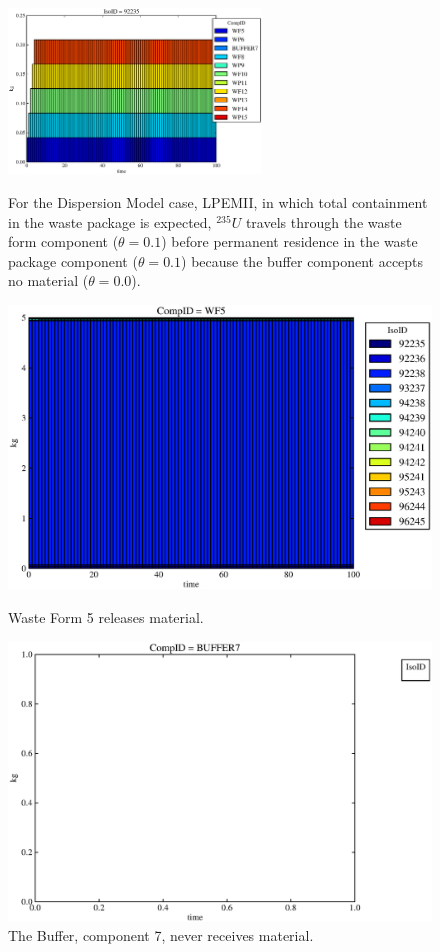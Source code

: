 \begin{figure}[ht]
\centering
\includegraphics[width=0.6\textwidth]{./chapters/demonstration/base/lpDMII.eps}
\caption[$^{235}U$ residence. Lumped Parameter  DM Waste Package No Release.]{
For the Dispersion Model case, LPEMII, in which total containment in the waste 
package is expected, $^{235}U$ travels through the waste form component ($\theta 
= 0.1$) before permanent residence in the waste package component ($\theta = 
0.1$) because the buffer component accepts no material ($\theta = 0.0$).  }
\label{fig:lpDMIIall}
\begin{minipage}[b]{0.45\linewidth}

  \includegraphics[width=\textwidth]{./chapters/demonstration/base/lpDMII1.eps}
  \caption[Case LPDMII Waste Form Contaminants.]{
    Waste Form 5 releases material. 
    }
  \label{fig:lpDMIIwf5}
  
  \includegraphics[width=\textwidth]{./chapters/demonstration/base/lpDMII3.eps}
  \caption[Case LPDMII Buffer Contaminants]{
    The Buffer, component 7, never receives material.
    }
  \label{fig:lpDMIIbuff}


\end{minipage}
\end{figure}
